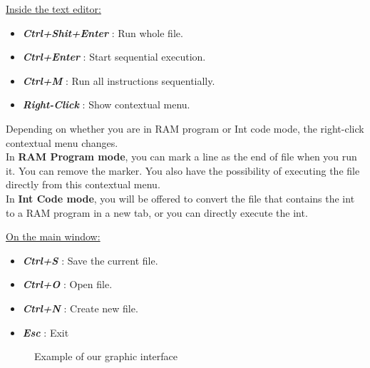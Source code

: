 \underline{Inside the text editor:}
\begin{itemize}
    \item \textbf{\textit{Ctrl+Shit+Enter}} : Run whole file.
    \item \textbf{\textit{Ctrl+Enter}} : Start sequential execution.
    \item \textbf{\textit{Ctrl+M}} : Run all instructions sequentially.
    \item \textbf{\textit{Right-Click}} : Show contextual menu.
\end{itemize}
Depending on whether you are in RAM program or Int code mode, the right-click contextual menu changes.\\
In \textbf{RAM Program mode}, you can mark a line as the end of file when you run it. You can remove the marker.
You also have the possibility of executing the file directly from this contextual menu.\\
In \textbf{Int Code mode}, you will be offered to convert the file that contains the int to a RAM program in a new tab, or you can directly execute the int.


\underline{On the main window:}
\begin{itemize}
    \item \textbf{\textit{Ctrl+S}} : Save the current file.
    \item \textbf{\textit{Ctrl+O}} : Open file.
    \item \textbf{\textit{Ctrl+N}} : Create new file.
    \item \textbf{\textit{Esc}} : Exit
\end{itemize}


\begin{figure}[t]%
    \centering
    \qquad
    \caption{Example of our graphic interface}%
    \label{fig:gui}%
\end{figure}
